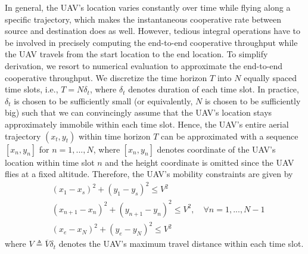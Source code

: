 \documentclass[12pt, draftclsnofoot, onecolumn]{IEEEtran}
\begin{document}
In general, the UAV's location varies constantly over time while flying along a specific trajectory, which makes the instantaneous cooperative rate between source and destination does as well. However, tedious integral operations have to be involved in precisely computing the end-to-end cooperative throughput while the UAV travels from the start location to the end location. To simplify derivation, we resort to numerical evaluation to approximate the end-to-end cooperative throughput. We discretize the time horizon $T$ into $N$ equally spaced time slots, i.e., $T=N\delta_{t}$, where $\delta_{t}$ denotes duration of each time slot. In practice, $\delta_{t}$ is chosen to be sufficiently small (or equivalently, $N$ is chosen to be sufficiently big) such that we can convincingly assume that the UAV's location stays approximately immobile within each time slot. Hence, the UAV's entire aerial trajectory $(x_{t},y_{t})$ within time horizon $T$ can be approximated with a sequence $[x_{n},y_{n}]$ for $n=1,...,N$, where $[x_{n},y_{n}]$ denotes coordinate of the UAV's location within time slot $n$ and the height coordinate is omitted since the UAV flies at a fixed altitude. Therefore, the UAV's mobility constraints are given by
\begin{equation}
\begin{aligned}
&(x_{1}-x_{s})^{2}+(y_{1}-y_{s})^{2}\leq V^{2}\\
&(x_{n+1}-x_{n})^{2}+(y_{n+1}-y_{n})^{2}\leq V^{2},\quad\forall n=1,...,N-1\\
&(x_{e}-x_{N})^{2}+(y_{e}-y_{N})^{2}\leq V^{2}
\end{aligned}
\end{equation}
where $V\triangleq\overline{V}\delta _{t}$ denotes the UAV's maximum travel distance within each time slot.
\end{document}
